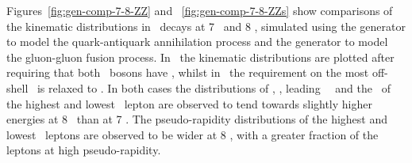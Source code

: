 Figures~\ref{fig:gen-comp-7-8-ZZ} and ~\ref{fig:gen-comp-7-8-ZZs} show comparisons of the kinematic distributions in \ZZllll\
decays at 7 \tev\ and 8 \tev, simulated using the \powhegbox\cite{Melia:2011tj} generator
to model the quark-antiquark annihilation process and the \ggtwoZZ\cite{gg2ZZ} generator to
model the gluon-gluon fusion process. 
In~ the kinematic
distributions are plotted after requiring that both \Z\ bosons have \sstooos,
whilst in~\fig{gen-comp-7-8-ZZs} the requirement on the most off-shell \Z\ is
relaxed to \mZgtt. In both cases the distributions of \mZZ, \ptZZ, leading \Z\
\pt\ and the \pt\ of the highest and lowest \pt\ lepton are observed to tend towards
slightly higher energies at 8 \tev\ than at 7 \tev. The pseudo-rapidity
distributions of the highest and lowest \pt\ leptons are observed to be wider at
8 \tev, with a greater fraction of the leptons at high pseudo-rapidity.

